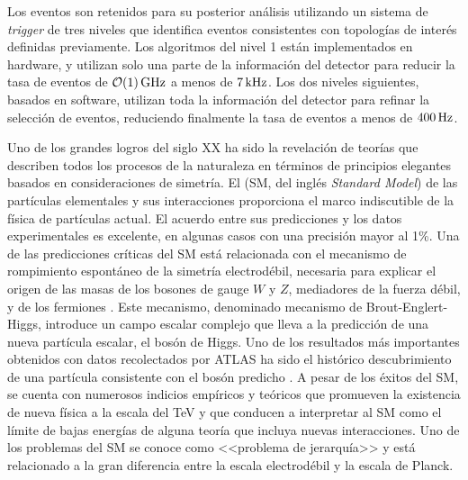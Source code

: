 Los eventos son retenidos para su posterior análisis utilizando un sistema de
\emph{trigger} de tres niveles \cite{Aad:2012xs} que identifica eventos consistentes
con topologías de interés definidas previamente. Los algoritmos del nivel 1 están
implementados en hardware, y utilizan solo una parte de la información del detector para
reducir la tasa de eventos de $\unit[\mathcal{O}(1)]{GHz}$ a menos de $\unit[7]{kHz}$. Los dos niveles siguientes,
basados en software, utilizan toda la información del detector para refinar la selección
de eventos, reduciendo finalmente la tasa de eventos a menos de  $\unit[400]{Hz}$.

Uno de los grandes logros del siglo XX ha sido la revelación de teorías que
describen todos los procesos de la naturaleza en términos de principios
elegantes basados en consideraciones de simetría. El {\SM} (SM, del inglés \emph{Standard Model})
\cite{PhysRevLett.19.1264,PhysRev.127.965,Glashow1961579} de las partículas
elementales y sus interacciones proporciona el marco indiscutible de la física
de partículas actual. El acuerdo entre sus predicciones y los datos
experimentales es excelente, en algunas casos con una precisión mayor al 1\%.
Una de las predicciones críticas del SM está relacionada con el mecanismo de
rompimiento espontáneo de la simetría electrodébil, necesaria para explicar el
origen de las masas de los bosones de gauge $W$ y $Z$, mediadores de la fuerza
débil, y de los fermiones \cite{PhysRevLett.13.321,PhysRevLett.13.508}. Este
mecanismo, denominado mecanismo de Brout-Englert-Higgs, introduce un campo escalar complejo
que lleva a la predicción de
una nueva partícula escalar, el bosón de Higgs. Uno de los resultados más
importantes obtenidos con datos recolectados por ATLAS ha sido el histórico
descubrimiento de una partícula consistente con el bosón predicho \cite{Aad:2012tfa}.
A pesar de los éxitos del SM, se cuenta con numerosos
indicios empíricos y teóricos que promueven la existencia de nueva física a la
escala del TeV y que conducen a interpretar al SM como el límite de bajas
energías de alguna teoría que incluya nuevas interacciones.
Uno de los problemas del SM se conoce como <<problema de jerarquía>> y está
relacionado a la gran diferencia entre la escala electrodébil y la escala de Planck.

